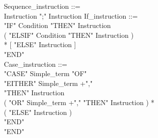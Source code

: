 \documentclass[12pt,a4paper,draft]{article}
\begin{document}
{\begin{sloppypar}
Sequence\_instruction ::= \\
\hspace*{0.20in}Instruction  ";"  Instruction If\_instruction ::= \\
\hspace*{0.20in}  "IF"  Condition  "THEN"  Instruction  \\
\hspace*{0.20in}  ( "ELSIF"  Condition  "THEN"  Instruction )\\
\hspace*{0.20in}* [ "ELSE"  Instruction ] \\
  "END" \\
Case\_instruction ::= \\
\hspace*{0.20in}  "CASE"  Simple\_term  "OF"\\
\hspace*{0.20in}  "EITHER"  Simple\_term +","\\
\hspace*{0.20in}  "THEN"  Instruction  \\
\hspace*{0.20in}  ( "OR"  Simple\_term +","   "THEN"  Instruction ) *\\
\hspace*{0.20in}  ( "ELSE"  Instruction ) \\ %
\hspace*{0.20in}  "END"\\
\hspace*{0.20in}  "END" \\
  

\end{sloppypar}}
\end{document}
